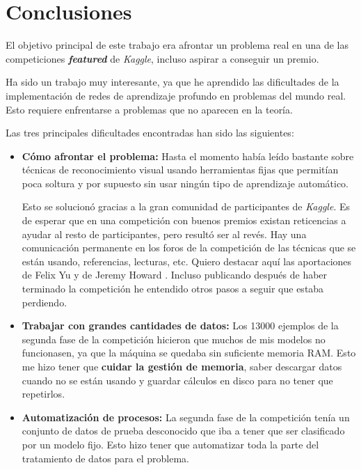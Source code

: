 
\chapter{Conclusiones} %
\label{chap:conclusiones} %

El objetivo principal de este trabajo era afrontar un problema real en una de
las competiciones \textit{\textbf{featured}} de \textit{Kaggle}, incluso
aspirar a conseguir un premio.

Ha sido un trabajo muy interesante, ya que he aprendido las dificultades
de la implementación de redes de aprendizaje profundo en problemas del
mundo real. Esto requiere enfrentarse a problemas que no aparecen en la teoría.

Las tres principales dificultades encontradas han sido las siguientes:

\begin{itemize}
    \item{\textbf{Cómo afrontar el problema:}
     Hasta el momento había leído bastante sobre
    técnicas de reconocimiento visual usando herramientas fijas que permitían poca
    soltura y por supuesto sin usar ningún tipo de aprendizaje automático.

    Esto se solucionó gracias a la gran comunidad de participantes de
    \textit{Kaggle}. Es de esperar que en una competición con buenos premios
    existan reticencias a ayudar al resto de participantes, pero resultó ser al
    revés. Hay una comunicación permanente en los foros de la competición de las
    técnicas que se están usando, referencias, lecturas, etc. Quiero destacar aquí
    las aportaciones de Felix Yu \parencite{felixyu} y de Jeremy Howard
    \parencite{fastai}. Incluso publicando después de haber terminado la
    competición he entendido otros pasos a seguir que estaba perdiendo. }

    \item{\textbf{Trabajar con grandes cantidades de datos:}
    Los 13000 ejemplos de la segunda fase de la competición hicieron que muchos de
    mis modelos no funcionasen, ya que la máquina se quedaba sin suficiente memoria
    RAM. Esto me hizo tener que \textbf{cuidar la gestión de memoria}, saber
    descargar datos cuando no se están usando y guardar cálculos en disco para no
    tener que repetirlos.  }

    \item{\textbf{Automatización de procesos:}
    La segunda fase de la competición tenía un conjunto de datos de prueba
    desconocido que iba a tener que ser clasificado por un modelo fijo. Esto
    hizo tener que automatizar toda la parte del tratamiento de datos para el
    problema.  }

\end{itemize}

